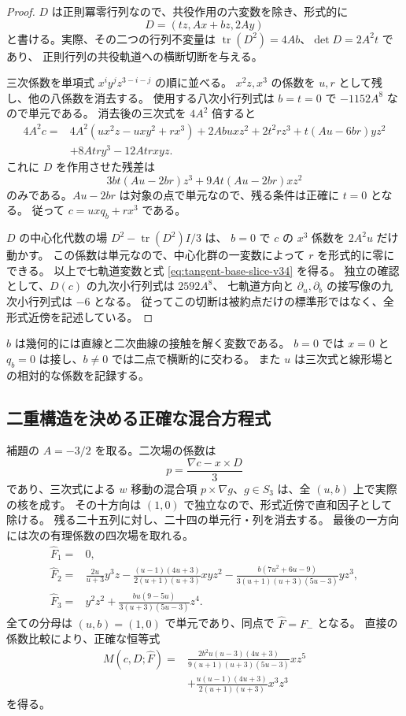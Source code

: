 \begin{proof}
$D$ は正則冪零行列なので、共役作用の六変数を除き、形式的に
\[
 D=(tz,Ax+bz,2Ay)
\]
と書ける。実際、その二つの行列不変量は
$\operatorname{tr}(D^2)=4Ab$、$\det D=2A^2t$ であり、
正則行列の共役軌道への横断切断を与える。

三次係数を単項式 $x^iy^jz^{3-i-j}$ の順に並べる。
$x^2z,x^3$ の係数を $u,r$ として残し、他の八係数を消去する。
使用する八次小行列式は $b=t=0$ で $-1152A^8$ なので単元である。
消去後の三次式を $4A^2$ 倍すると
\begin{align*}
 4A^2c={}&4A^2(ux^2z-uxy^2+rx^3)+2Abu xz^2
       +2t^2r z^3+t(Au-6br)yz^2\\
       &+8Atr y^3-12Atr xyz.
\end{align*}
これに $D$ を作用させた残差は
\[
 3bt(Au-2br)z^3+9At(Au-2br)xz^2
\]
のみである。$Au-2br$ は対象の点で単元なので、残る条件は正確に $t=0$ となる。
従って $c=uxq_b+rx^3$ である。

$D$ の中心化代数の場 $D^2-\operatorname{tr}(D^2)I/3$ は、
$b=0$ で $c$ の $x^3$ 係数を $2A^2u$ だけ動かす。
この係数は単元なので、中心化群の一変数によって $r$ を形式的に零にできる。
以上で七軌道変数と式 \eqref{eq:tangent-base-slice-v34} を得る。
独立の確認として、$D(c)$ の九次小行列式は $2592A^8$、
七軌道方向と $\partial_u,\partial_b$ の接写像の九次小行列式は $-6$ となる。
従ってこの切断は被約点だけの標準形ではなく、全形式近傍を記述している。
\end{proof}

$b$ は幾何的には直線と二次曲線の接触を解く変数である。
$b=0$ では $x=0$ と $q_b=0$ は接し、$b\ne0$ では二点で横断的に交わる。
また $u$ は三次式と線形場との相対的な係数を記録する。

\subsection{二重構造を決める正確な混合方程式}

補題の $A=-3/2$ を取る。二次場の係数は
\[
 p=\frac{\nabla c-x\times D}{3}
\]
であり、三次式による $w$ 移動の混合項
$p\times\nabla g$、$g\in S_3$ は、全 $(u,b)$ 上で実際の核を成す。
その十方向は $(1,0)$ で独立なので、形式近傍で直和因子として除ける。
残る二十五列に対し、二十四の単元行・列を消去する。
最後の一方向には次の有理係数の四次場を取れる。
\begin{align}
 \widehat F_1={}&0,\nonumber\\
 \widehat F_2={}&\frac{2u}{u+3}y^3z
 -\frac{(u-1)(4u+3)}{2(u+1)(u+3)}xyz^2
 -\frac{b(7u^2+6u-9)}{3(u+1)(u+3)(5u-3)}yz^3,\label{eq:tangent-double-Fhat-v34}\\
 \widehat F_3={}&y^2z^2+\frac{bu(9-5u)}{3(u+3)(5u-3)}z^4.\nonumber
\end{align}
全ての分母は $(u,b)=(1,0)$ で単元であり、同点で $\widehat F=F_-$ となる。
直接の係数比較により、正確な恒等式
\begin{align}
 M(c,D;\widehat F)
 ={}&\frac{2b^2u(u-3)(4u+3)}{9(u+1)(u+3)(5u-3)}xz^5\nonumber\\
 &+\frac{u(u-1)(4u+3)}{2(u+1)(u+3)}x^3z^3
 \label{eq:tangent-double-Schur-v34}
\end{align}
を得る。

